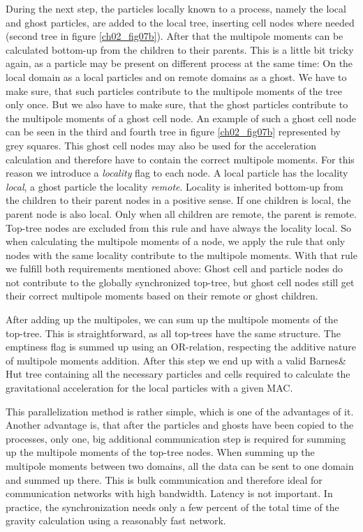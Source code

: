 During the next step, the particles locally known to a process, namely the local and ghost particles, are added to the local tree, inserting cell nodes where needed (second tree in figure \ref{ch02_fig07b}). After that the multipole moments can be calculated bottom-up from the children to their parents. This is a little bit tricky again, as a particle may be present on different process at the same time: On the local domain as a local particles and on remote domains as a ghost. We have to make sure, that such particles contribute to the multipole moments of the tree only once. But we also have to make sure, that the ghost particles contribute to the multipole moments of a ghost cell node. An example of such a ghost cell node can be seen in the third and fourth tree in figure \ref{ch02_fig07b} represented by grey squares. This ghost cell nodes may also be used for the acceleration calculation and therefore have to contain the correct multipole moments. For this reason we introduce a \emph{locality} flag to each node. A local particle has the locality \emph{local}, a ghost particle the locality \emph{remote}. Locality is inherited bottom-up from the children to their parent nodes in a positive sense. If one children is local, the parent node is also local. Only when all children are remote, the parent is remote. Top-tree nodes are excluded from this rule and have always the locality local. So when calculating the multipole moments of a node, we apply the rule that only nodes with the same locality contribute to the multipole moments. With that rule we fulfill both requirements mentioned above: Ghost cell and particle nodes do not contribute to the globally synchronized top-tree, but ghost cell nodes still get their correct multipole moments based on their remote or ghost children.

After adding up the multipoles, we can sum up the multipole moments of the top-tree. This is straightforward, as all top-trees have the same structure. The emptiness flag is summed up using an OR-relation, respecting the additive nature of multipole moments addition. After this step we end up with a valid Barnes\& Hut tree containing all the necessary particles and cells required to calculate the gravitational acceleration for the local particles with a given MAC.

This parallelization method is rather simple, which is one of the advantages of it. Another advantage is, that after the particles and ghosts have been copied to the processes, only one, big additional communication step is required for summing up the multipole moments of the top-tree nodes. When summing up the multipole moments between two domains, all the data can be sent to one domain and summed up there. This is bulk communication and therefore ideal for communication networks with high bandwidth. Latency is not important. In practice, the synchronization needs only a few percent of the total time of the gravity calculation using a reasonably fast network.


